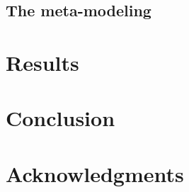 \documentclass[10pt]{article} %
\begin{document}
\subsection{The meta-modeling}

\section{Results}

\section{Conclusion}

\section{Acknowledgments}
\end{document}
